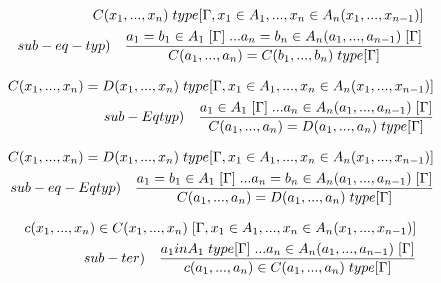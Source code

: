 \begin{equation}
\begin{split}
C(x_1,...,x_n)\hspace{0.1cm}type[\Gamma, x_1 \in A_1,...,x_n \in A_n(x_1,...,x_{n-1})] \\ sub-eq-typ) \quad \frac{a_1 = b_1  \in A_1\hspace{0.1cm}[\Gamma]\hspace{0.1cm}...a_n = b_n \in A_n(a_1,...,a_{n-1})\hspace{0.1cm}[\Gamma]}{C(a_1,...,a_n) = C(b_1,...,b_n) \hspace{0.1cm}type[\Gamma]}
\end{split}
\end{equation}

\begin{equation}
\begin{split}
C(x_1,...,x_n) = D(x_1,...,x_n) \hspace{0.1cm}type[\Gamma, x_1 \in A_1,...,x_n \in A_n(x_1,...,x_{n-1})] \\ sub-Eqtyp) \quad \frac{a_1 \in A_1\hspace{0.1cm}[\Gamma]\hspace{0.1cm}...a_n \in A_n(a_1,...,a_{n-1})\hspace{0.1cm}[\Gamma]}{C(a_1,...,a_n) = D(a_1,...,a_n)\hspace{0.1cm}type[\Gamma]}
\end{split}
\end{equation}

\begin{equation}
\begin{split}
C(x_1,...,x_n) = D(x_1,...,x_n) \hspace{0.1cm}type[\Gamma, x_1 \in A_1,...,x_n \in A_n(x_1,...,x_{n-1})] \\ sub-eq-Eqtyp) \quad \frac{a_1 = b_1\in A_1\hspace{0.1cm}[\Gamma]\hspace{0.1cm}...a_n = b_n \in A_n(a_1,...,a_{n-1})\hspace{0.1cm}[\Gamma]}{C(a_1,...,a_n) = D(a_1,...,a_n)\hspace{0.1cm}type[\Gamma]}
\end{split}
\end{equation}

\begin{equation}
\begin{split}
c(x_1,...,x_n) \in C(x_1,...,x_n) \hspace{0.1cm}[\Gamma, x_1 \in A_1,...,x_n \in A_n(x_1,...,x_{n-1})] \\ sub-ter) \quad \frac{a_1 in A_1\hspace{0.1cm}type[\Gamma]\hspace{0.1cm}...a_n \in A_n(a_1,...,a_{n-1})\hspace{0.1cm}[\Gamma]}{ c(a_1,...,a_n) \in C(a_1,...,a_n)\hspace{0.1cm}type[\Gamma]}
\end{split}
\end{equation}

